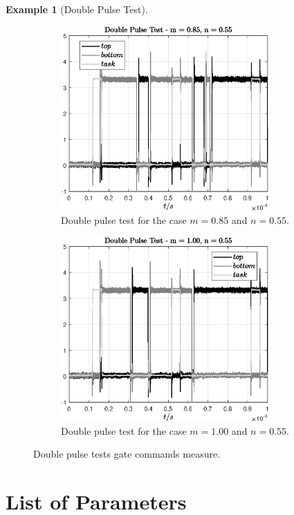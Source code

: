 \documentclass[11pt,a4paper,oneside]{book}
\numberwithin{equation}{section}
\theoremstyle{it}
\theoremstyle{definition}
\newtheorem{example}{Example}[section]
\begin{document}
\begin{example}[Double Pulse Test]
	\begin{figure}[H]
		\centering
		\begin{subfigure}{.5\textwidth}
			\centering
			\includegraphics[width = 225pt, angle = 0, 
			keepaspectratio]{figures/double_pulse_test/measure_case_m085_n055.eps}
			\captionsetup{width=0.5\textwidth, font=small}	
			\caption{Double pulse test for the case $m = 0.85$ and $n = 0.55$.}
			\label{}
		\end{subfigure}%
		\begin{subfigure}{.5\textwidth}
			\centering
			\includegraphics[width = 225pt, angle = 0, 
			keepaspectratio]{figures/double_pulse_test/measure_case_m100_n055.eps}
			\captionsetup{width=0.5\textwidth, font=small}	
			\caption{Double pulse test for the case $m = 1.00$ and $n = 0.55$.}
			\label{}
		\end{subfigure}
		\captionsetup{width=0.5\textwidth, font=small}
		\caption{Double pulse tests gate commands measure.}
		\label{}
	\end{figure} 
\end{example}

\section{List of Parameters}	
\end{document}
